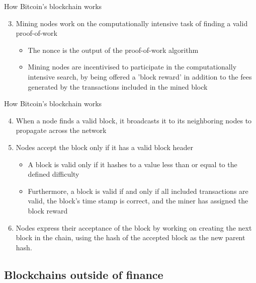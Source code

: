 \documentclass[10pt]{beamer}
\begin{document}

\begin{frame}{How Bitcoin's blockchain works}
	\begin{enumerate}
		\setcounter{enumi}{2}
		\item Mining nodes work on the computationally intensive task of finding a valid proof-of-work
		\begin{itemize}
			\item The nonce is the output of the proof-of-work algorithm
			\item Mining nodes are incentivised to participate in the computationally intensive search, by being offered a 'block reward' in addition to the fees generated by the transactions included in the mined block
		\end{itemize}
	\end{enumerate}
\end{frame}



\begin{frame}{How Bitcoin's blockchain works}
	\begin{enumerate}
		\setcounter{enumi}{3}
		\item When a node finds a valid block, it broadcasts it to its neighboring nodes to propagate across the network
		\item Nodes accept the block only if it has a valid block header
		\begin{itemize}
			\item A block is valid only if it hashes to a value less than or equal to the defined difficulty
			\item Furthermore, a block is valid if and only if all included transactions are valid, the block's time stamp is correct, and the miner has assigned the block reward
		\end{itemize}
		\item Nodes express their acceptance of the block by working on creating the next block in the chain, using the hash of the accepted block as the new parent hash.
	\end{enumerate}
\end{frame}


\subsection{Blockchains outside of finance}
\end{document}
